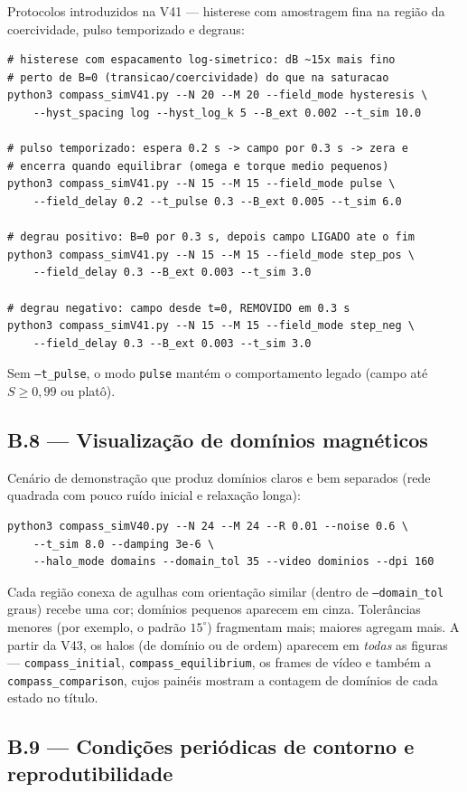 \documentclass[11pt,a4paper]{article}
\newcommand{\code}[1]{\texttt{#1}}
\begin{document}
\medskip\noindent
Protocolos introduzidos na V41 --- histerese com amostragem fina na
região da coercividade, pulso temporizado e degraus:
\begin{verbatim}
# histerese com espacamento log-simetrico: dB ~15x mais fino
# perto de B=0 (transicao/coercividade) do que na saturacao
python3 compass_simV41.py --N 20 --M 20 --field_mode hysteresis \
    --hyst_spacing log --hyst_log_k 5 --B_ext 0.002 --t_sim 10.0

# pulso temporizado: espera 0.2 s -> campo por 0.3 s -> zera e
# encerra quando equilibrar (omega e torque medio pequenos)
python3 compass_simV41.py --N 15 --M 15 --field_mode pulse \
    --field_delay 0.2 --t_pulse 0.3 --B_ext 0.005 --t_sim 6.0

# degrau positivo: B=0 por 0.3 s, depois campo LIGADO ate o fim
python3 compass_simV41.py --N 15 --M 15 --field_mode step_pos \
    --field_delay 0.3 --B_ext 0.003 --t_sim 3.0

# degrau negativo: campo desde t=0, REMOVIDO em 0.3 s
python3 compass_simV41.py --N 15 --M 15 --field_mode step_neg \
    --field_delay 0.3 --B_ext 0.003 --t_sim 3.0
\end{verbatim}
Sem \code{--t\_pulse}, o modo \code{pulse} mantém o comportamento
legado (campo até $S \geq 0{,}99$ ou platô).

\subsection*{B.8 --- Visualização de domínios magnéticos}

Cenário de demonstração que produz domínios claros e bem separados
(rede quadrada com pouco ruído inicial e relaxação longa):
\begin{verbatim}
python3 compass_simV40.py --N 24 --M 24 --R 0.01 --noise 0.6 \
    --t_sim 8.0 --damping 3e-6 \
    --halo_mode domains --domain_tol 35 --video dominios --dpi 160
\end{verbatim}
Cada região conexa de agulhas com orientação similar (dentro de
\code{--domain\_tol} graus) recebe uma cor; domínios pequenos aparecem
em cinza. Tolerâncias menores (por exemplo, o padrão $15^\circ$)
fragmentam mais; maiores agregam mais. A partir da V43, os halos
(de domínio ou de ordem) aparecem em \emph{todas} as figuras —
\code{compass\_initial}, \code{compass\_equilibrium}, os frames de
vídeo e também a \code{compass\_comparison}, cujos painéis mostram a
contagem de domínios de cada estado no título.

\subsection*{B.9 --- Condições periódicas de contorno e
reprodutibilidade}
\end{document}
